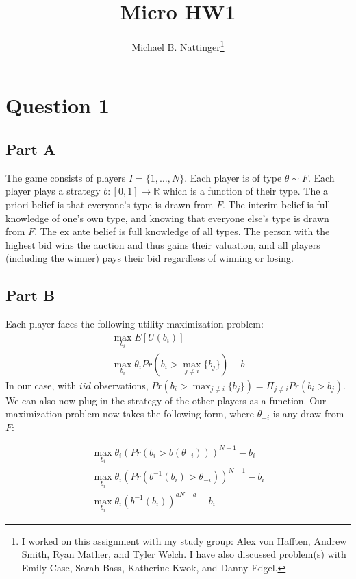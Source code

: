 \documentclass[11pt]{article} %
\title{Micro HW1}
\author{Michael B. Nattinger\footnote{I worked on this assignment with my study group: Alex von Hafften, Andrew Smith, Ryan Mather, and Tyler Welch. I have also discussed problem(s) with Emily Case, Sarah Bass, Katherine Kwok, and Danny Edgel.}}
\begin{document}
\maketitle

\section{Question 1}
\subsection{Part A}
The game consists of players $I = \{ 1,\dots,N\}$. Each player is of type $\theta \sim  F$. Each player plays a strategy $b:[0,1]\rightarrow \mathbb{R}$ which is a function of their type. The a priori belief is that everyone's type is drawn from $F$. The interim belief is full knowledge of one's own type, and knowing that everyone else's type is drawn from $F$. The ex ante belief is full knowledge of all types. The person with the highest bid wins the auction and thus gains their valuation, and all players (including the winner) pays their bid regardless of winning or losing.
\subsection{Part B}
Each player faces the following utility maximization problem:
\begin{align*}
\max_{b_i} E[U(b_i)]\\
\max_{b_i} \theta_i Pr(b_i>\max_{j\neq i}\{b_{j}\}) - b
\end{align*}
In our case, with $iid$ observations, $Pr(b_i>\max_{j\neq i}\{b_{j}\}) = \Pi_{j\neq i}Pr(b_i>b_{j})$. We can also now plug in the strategy of the other players as a function. Our maximization problem now takes the following form, where $\theta_{-i}$ is any draw from $F$: 

\begin{align*}
\max_{b_i} \theta_i (Pr(b_i>b(\theta_{-i})))^{N-1} - b_i\\
\max_{b_i} \theta_i (Pr(b^{-1}(b_i)>\theta_{-i}))^{N-1} - b_i \\
\max_{b_i} \theta_i (b^{-1}(b_i))^{aN-a} - b_i
\end{align*}
\end{document}
